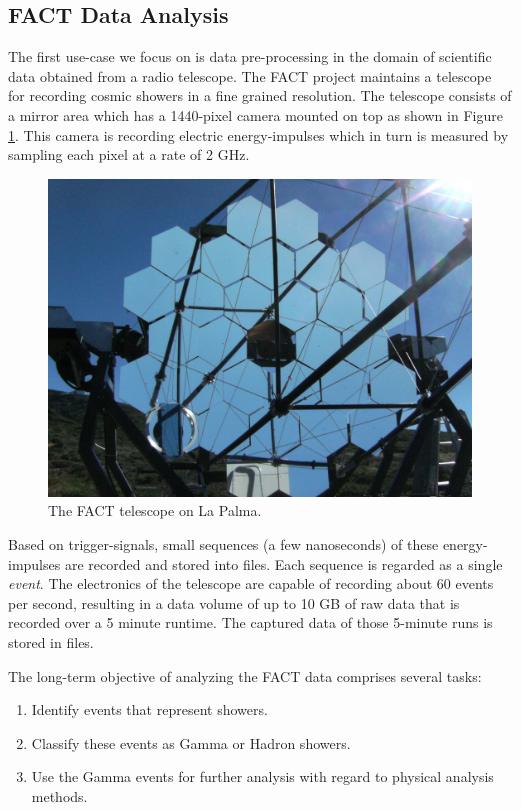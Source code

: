 \subsection{\label{sec:fact}FACT Data Analysis}
The first use-case we focus on is data pre-processing in the domain of
scientific data obtained from a radio telescope. The FACT project
maintains a telescope for recording cosmic showers in a fine grained
resolution. The telescope consists of a mirror area which has a
1440-pixel camera mounted on top as shown in Figure
\ref{fig:factTelescope}. This camera is recording electric
energy-impulses which in turn is measured by sampling each pixel at a
rate of 2 GHz.

\begin{figure}[h!]
\centering
\includegraphics[scale=0.2]{graphics/fact-telescope.jpg}
\caption{\label{fig:factTelescope}The FACT telescope on La Palma.}
\end{figure}

Based on trigger-signals, small sequences (a few
nanoseconds) of these energy-impulses are recorded and stored into 
files. Each sequence is regarded as a single {\em event}. 
The electronics of the telescope are capable of recording about
60 events per second, resulting in a data volume of up to 10 GB
of raw data that is recorded over a 5 minute runtime. The captured
data of those 5-minute runs is stored in files.


The long-term objective of analyzing the FACT data comprises several tasks:
\begin{enumerate}
  \item Identify events that represent showers.
  \item Classify these events as Gamma or Hadron showers.
  \item Use the Gamma events for further analysis with regard to physical analysis methods.
\end{enumerate}

